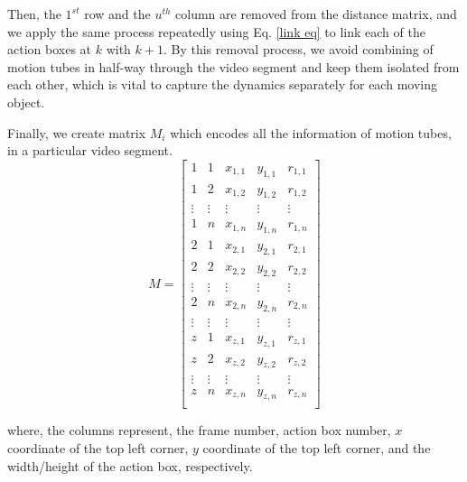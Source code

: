 Then, the $1^{st}$ row and the $u^{th}$ column are removed from the distance matrix, and we apply the same process repeatedly using Eq. \ref{link eq}
to link each of the action boxes at $k$ with $k+1$. By this removal process, we avoid combining of motion tubes in half-way through
the video segment and keep them isolated from each other, which is vital to capture the dynamics separately for each moving object.




Finally, we create matrix $M_{i}$ which encodes all the information of motion tubes, in a particular video segment.
\begin{equation}
M=\begin{bmatrix}
    1       & 1 & x_{1,1} & y_{1,1} & r_{1,1} \\
    1       & 2 & x_{1,2} & y_{1,2} & r_{1,2} \\
    \vdots       & \vdots & \vdots & \vdots & \vdots \\
    1       & n & x_{1,n} & y_{1,n} & r_{1,n} \\
    2       & 1 & x_{2,1} & y_{2,1} & r_{2,1} \\
    2       & 2 & x_{2,2} & y_{2,2} & r_{2,2} \\
    \vdots       & \vdots & \vdots & \vdots & \vdots \\
    2       & n & x_{2,n} & y_{2,n} & r_{2,n} \\
    \vdots       & \vdots & \vdots & \vdots & \vdots \\
    z       & 1 & x_{z,1} & y_{z,1} & r_{z,1} \\
    z       & 2 & x_{z,2} & y_{z,2} & r_{z,2} \\
    \vdots       & \vdots & \vdots & \vdots & \vdots \\
    z       & n & x_{z,n} & y_{z,n} & r_{z,n} \\

\end{bmatrix}
\end{equation}

where, the columns represent, the frame number, action box number, $x$ coordinate of the top left corner,
$y$ coordinate of the top left corner, and the width/height of the action box, respectively.

